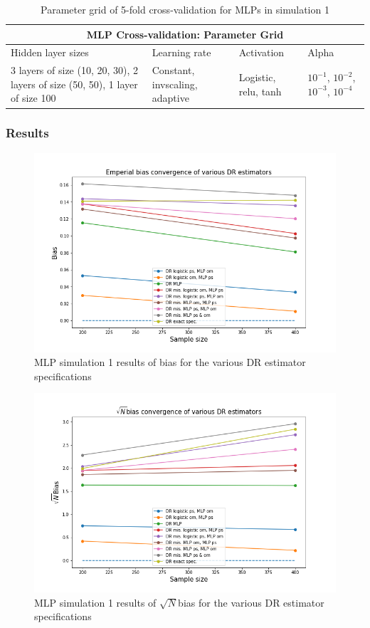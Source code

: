 \documentclass[12pt,twoside]{article}
\begin{document}
\begin{table}[h!]
    \centering
\begin{tabular}{ |p{3cm}|p{3cm}|p{3cm}|p{3cm}| }
 \hline
 \multicolumn{4}{|c|}{MLP Cross-validation: Parameter Grid} \\
 \hline
 Hidden layer sizes & Learning rate & Activation & Alpha\\
 \hline
 3 layers of size (10, 20, 30), 2 layers of size (50, 50), 1 layer of size 100 & Constant, invscaling, adaptive & Logistic, relu, tanh & $10^{-1}$, $10^{-2}$, $10^{-3}$, $10^{-4}$ \\
 \hline 
\end{tabular}
\caption{Parameter grid of 5-fold cross-validation for MLPs in simulation 1}
\label{tableMLP}
\end{table}

\subsubsection*{Results}

\begin{figure}[h!]
    \centering
    \includegraphics[width = 0.9\columnwidth]{figures/biasMLP.png}
    \caption{MLP simulation 1 results of bias for the various DR estimator specifications}
    \label{figbiasMLP}
\end{figure}

\begin{figure}[h!]
    \centering
    \includegraphics[width = 0.9\columnwidth]{figures/sqrtnMLP.png}
    \caption{MLP simulation 1 results of $\sqrt{N}$bias for the various DR estimator specifications}
    \label{figsqrtnMLP}
\end{figure}
\end{document}
